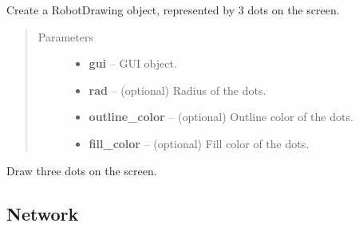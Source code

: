 \documentclass[letterpaper,10pt,english]{sphinxmanual}
\begin{document}
\begin{fulllineitems}
\label{api:graphic.RobotDrawing}
Create a RobotDrawing object, represented by 3 dots on the screen.
\begin{quote}\begin{description}
\item[{Parameters}] \leavevmode\begin{itemize}
\item {} 
\textbf{gui} -- GUI object.

\item {} 
\textbf{rad} -- (optional) Radius of the dots.

\item {} 
\textbf{outline\_color} -- (optional) Outline color of the dots.

\item {} 
\textbf{fill\_color} -- (optional) Fill color of the dots.

\end{itemize}

\end{description}\end{quote}

\begin{fulllineitems}
\label{api:graphic.RobotDrawing.draw}
Draw three dots on the screen.

\end{fulllineitems}


\end{fulllineitems}



\subsection{Network}
\label{api:network}
\end{document}
